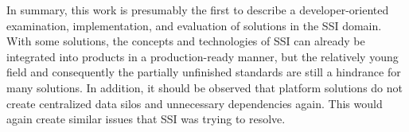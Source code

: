 In summary, this work is presumably the first to describe a developer-oriented examination, implementation, and evaluation of solutions in the \ac{SSI} domain. With some solutions, the concepts and technologies of \ac{SSI} can already be integrated into products in a production-ready manner, but the relatively young field and consequently the partially unfinished standards are still a hindrance for many solutions. In addition, it should be observed that platform solutions do not create centralized data silos and unnecessary dependencies again. This would again create similar issues that \ac{SSI} was trying to resolve.




